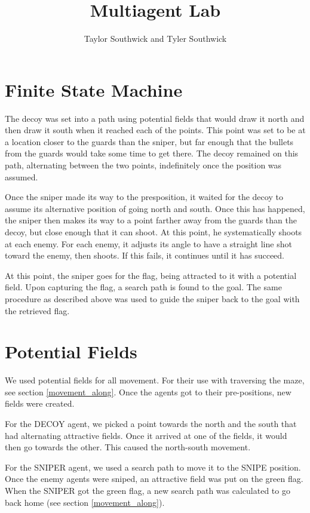 \documentclass{article}
\author{Taylor Southwick and Tyler Southwick}
\title{Multiagent Lab}
\begin{document}
\maketitle

\section{Finite State Machine}
The decoy was set into a path using potential fields that would draw it north and then draw it south when it reached each of the points.  This point was set to be at a location closer to the guards than the sniper, but far enough that the bullets from the guards would take some time to get there.  The decoy remained on this path, alternating between the two points, indefinitely once the position was assumed.

Once the sniper made its way to the presposition, it waited for the decoy to assume its alternative position of going north and south.  Once this has happened, the sniper then makes its way to a point farther away from the guards than the decoy, but close enough that it can shoot.  At this point, he systematically shoots at each enemy.  For each enemy, it adjusts its angle to have a straight line shot toward the enemy, then shoots.  If this fails, it continues until it has succeed.  

At this point, the sniper goes for the flag, being attracted to it with a potential field.  Upon capturing the flag, a search path is found to the goal.  The same procedure as described above was used to guide the sniper back to the goal with the retrieved flag.

\section{Potential Fields}
We used potential fields for all movement.
For their use with traversing the maze, see section \ref{movement_along}.
Once the agents got to their pre-positions, new fields were created.

For the DECOY agent, we picked a point towards the north and the south that had alternating attractive fields.
Once it arrived at one of the fields, it would then go towards the other.
This caused the north-south movement.

For the SNIPER agent, we used a search path to move it to the SNIPE position.
Once the enemy agents were sniped, an attractive field was put on the green flag.
When the SNIPER got the green flag, a new search path was calculated to go back home (see section \ref{movement_along}).
\end{document}
